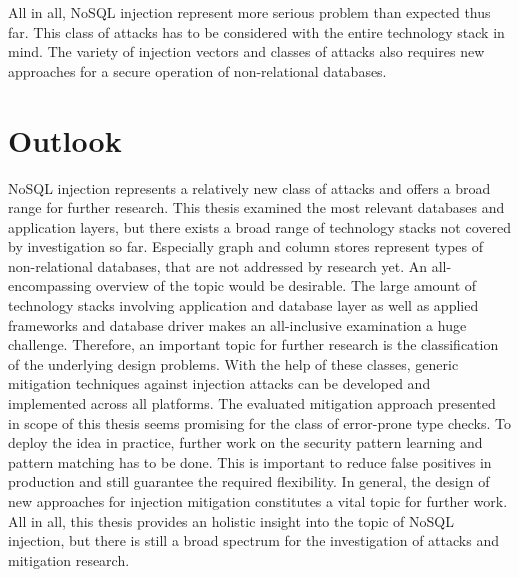 All in all, NoSQL injection represent more serious problem than expected thus far. This class of attacks has to be considered with the entire technology stack in mind. The variety of injection vectors and classes of attacks also requires new approaches for a secure operation of non-relational databases. 

\section{Outlook}
NoSQL injection represents a relatively new class of attacks and offers a broad range for further research. This thesis examined the most relevant databases and application layers, but there exists a broad range of technology stacks not covered by investigation so far. Especially graph and column stores represent types of non-relational databases, that are not addressed by research yet. An all-encompassing overview of the topic would be desirable. The large amount of technology stacks involving application and database layer as well as applied frameworks and database driver makes an all-inclusive examination a huge challenge. Therefore, an important topic for further research is the classification of the underlying design problems. With the help of these classes, generic mitigation techniques against injection attacks can be developed and implemented across all platforms. The evaluated mitigation approach presented in scope of this thesis seems promising for the class of error-prone type checks. To deploy the idea in practice, further work on the security pattern learning and pattern matching has to be done. This is important to reduce false positives in production and still guarantee the required flexibility. In general, the design of new approaches for injection mitigation constitutes a vital topic for further work. All in all, this thesis provides an holistic insight into the topic of NoSQL injection, but there is still a broad spectrum for the investigation of attacks and mitigation research. 